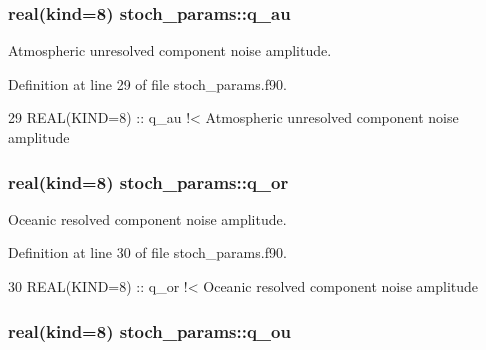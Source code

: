 \subsubsection[{\texorpdfstring{q\+\_\+au}{q_au}}]{\setlength{\rightskip}{0pt plus 5cm}real(kind=8) stoch\+\_\+params\+::q\+\_\+au}\hypertarget{namespacestoch__params_a437fce848ee222fc34893831a54e32e9}{}\label{namespacestoch__params_a437fce848ee222fc34893831a54e32e9}


Atmospheric unresolved component noise amplitude. 



Definition at line 29 of file stoch\+\_\+params.\+f90.


\begin{DoxyCode}
29   \textcolor{keywordtype}{REAL(KIND=8)} :: q\_au\textcolor{comment}{               !< Atmospheric unresolved component noise amplitude}
\end{DoxyCode}
\subsubsection[{\texorpdfstring{q\+\_\+or}{q_or}}]{\setlength{\rightskip}{0pt plus 5cm}real(kind=8) stoch\+\_\+params\+::q\+\_\+or}\hypertarget{namespacestoch__params_adc17ebaeabac74e33023f9e7bb8583ec}{}\label{namespacestoch__params_adc17ebaeabac74e33023f9e7bb8583ec}


Oceanic resolved component noise amplitude. 



Definition at line 30 of file stoch\+\_\+params.\+f90.


\begin{DoxyCode}
30   \textcolor{keywordtype}{REAL(KIND=8)} :: q\_or\textcolor{comment}{               !< Oceanic resolved component noise amplitude}
\end{DoxyCode}
\subsubsection[{\texorpdfstring{q\+\_\+ou}{q_ou}}]{\setlength{\rightskip}{0pt plus 5cm}real(kind=8) stoch\+\_\+params\+::q\+\_\+ou}\hypertarget{namespacestoch__params_a6b3308ad01c8ba1945332b05df447865}{}\label{namespacestoch__params_a6b3308ad01c8ba1945332b05df447865}



